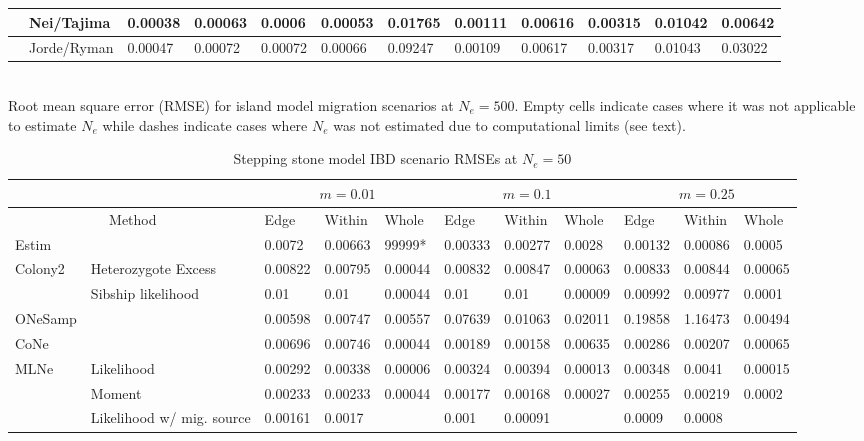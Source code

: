 \begin{landscape}
\begin{table}[h]
\begin{tabular}{ | l | p{2cm}|| l | l | l | l | l || l | l | l | l | l | }
 & Nei/Tajima & 0.00038 & 0.00063 & 0.0006 & 0.00053 & 0.01765 & 0.00111 & 0.00616 & 0.00315 & 0.01042 & 0.00642 \\ \hline
 & Jorde/Ryman & 0.00047 & 0.00072 & 0.00072 & 0.00066 & 0.09247 & 0.00109 & 0.00617 & 0.00317 & 0.01043 & 0.03022 \\ \hline 
\end{tabular}
\bigskip{}
{\footnotesize \\ Root mean square error (RMSE) for island model migration scenarios at $N_e = 500$. Empty cells indicate cases where it was not applicable to estimate $N_e$ while dashes indicate cases where $N_e$ was not estimated due to computational limits (see text).}
\end{table}

\begin{table}[h]
\centering \small
\caption[Stepping stone model IBD scenario RMSEs at $N_e = 50$]{Stepping stone model IBD scenario RMSEs at $N_e = 50$}
\label{tab:ne4}
\begin{tabular}{ | l| p{2cm}|| l| l| l|| l| l| l|| l| l| l| }
\hline
\multicolumn{2}{c}{ }   & \multicolumn{3}{c}{$m = 0.01$}  & \multicolumn{3}{c}{$m = 0.1$} & \multicolumn{3}{c}{$m = 0.25$}  \\ \hline
\multicolumn{2}{c}{Method} & Edge & Within & Whole & Edge & Within & Whole & Edge & Within & Whole \\ \hline
Estim & & 0.0072 & 0.00663 & 99999* & 0.00333 & 0.00277 & 0.0028 & 0.00132 & 0.00086 & 0.0005 \\ \hline
Colony2 & Heterozygote Excess & 0.00822 & 0.00795 & 0.00044 & 0.00832 & 0.00847 & 0.00063 & 0.00833 & 0.00844 & 0.00065 \\ \hline
 & Sibship likelihood & 0.01 & 0.01 & 0.00044 & 0.01 & 0.01 & 0.00009 & 0.00992 & 0.00977 & 0.0001 \\ \hline
ONeSamp &  & 0.00598 & 0.00747 & 0.00557 & 0.07639 & 0.01063 & 0.02011 & 0.19858 & 1.16473 & 0.00494 \\ \hline
CoNe &  & 0.00696 & 0.00746 & 0.00044 & 0.00189 & 0.00158 & 0.00635 & 0.00286 & 0.00207 & 0.00065 \\ \hline
MLNe  & Likelihood & 0.00292 & 0.00338 & 0.00006 & 0.00324 & 0.00394 & 0.00013 & 0.00348 & 0.0041 & 0.00015 \\ \hline
 & Moment  & 0.00233 & 0.00233 & 0.00044 & 0.00177 & 0.00168 & 0.00027 & 0.00255 & 0.00219 & 0.0002 \\ \hline
 & Likelihood w/ mig. source & 0.00161 & 0.0017 &  & 0.001 & 0.00091 &  & 0.0009 & 0.0008 &  \\ \hline

\end{tabular}
\end{table}
\end{landscape}
